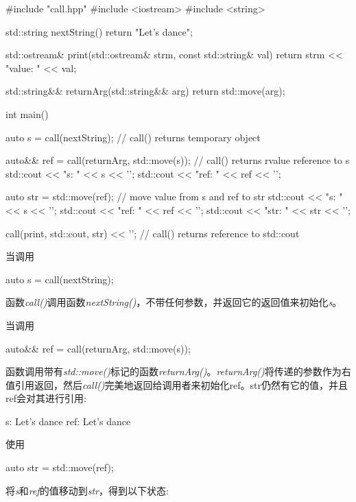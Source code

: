 \begin{cppcode}
#include "call.hpp"
#include <iostream>
#include <string>

std::string nextString()
{
	return "Let's dance";
}

std::ostream& print(std::ostream& strm, const std::string& val)
{
	return strm << "value: " << val;
}

std::string&& returnArg(std::string&& arg)
{
	return std::move(arg);
}

int main()
{
	auto s = call(nextString); // call() returns temporary object

	auto&& ref = call(returnArg, std::move(s)); // call() returns rvalue reference to s
	std::cout << "s: " << s << '\n';
	std::cout << "ref: " << ref << '\n';

	auto str = std::move(ref); // move value from s and ref to str
	std::cout << "s: " << s << '\n';
	std::cout << "ref: " << ref << '\n';
	std::cout << "str: " << str << '\n';

	call(print, std::cout, str) << '\n'; // call() returns reference to std::cout
}
\end{cppcode}

当调用

\begin{cppcode}
auto s = call(nextString);
\end{cppcode}

函数\textit{call()}调用函数\textit{nextString()}，不带任何参数，并返回它的返回值来初始化\textit{s}。

当调用

\begin{cppcode}
auto&& ref = call(returnArg, std::move(s));
\end{cppcode}

函数调用带有\textit{std::move()}标记的函数\textit{returnArg()}。\textit{returnArg()}将传递的参数作为右值引用返回，然后\textit{call()}完美地返回给调用者来初始化ref。str仍然有它的值，并且ref会对其进行引用:

\begin{outputcode}
s: Let's dance
ref: Let's dance
\end{outputcode}

使用

\begin{cppcode}
auto str = std::move(ref);
\end{cppcode}

将\textit{s}和\textit{ref}的值移动到\textit{str}，得到以下状态:

